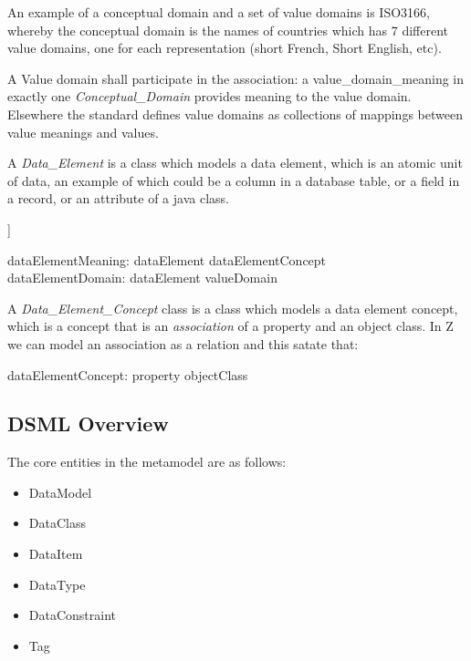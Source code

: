\documentclass{llncs}
\begin{document}
An example of a conceptual domain and a set of value domains is ISO3166, whereby the conceptual domain is the names of countries which has 7 different value domains, one for each representation (short French, Short English, etc).

A Value domain shall participate in the association: a value\_domain\_meaning in exactly one \emph{Conceptual\_Domain} provides meaning to the value domain. Elsewhere the standard defines value domains as collections of mappings between value meanings and values.

A \emph{Data\_Element} is a class which models a data element, which is an atomic unit of data, an example of which could be a column in a database table, or a field in a record, or an attribute of a java class.


\begin{zed}
]
\end{zed}
\begin{zed}
dataElementMeaning: dataElement \pfun dataElementConcept\\
dataElementDomain: dataElement \pfun valueDomain
\end{zed}

A \emph{Data\_Element\_Concept} class is a class which models a data element concept, which is a concept that is an \emph{association} of a property and an object class. In Z we can model an association as a relation and this satate that:

\begin{zed}
dataElementConcept: property \pfun objectClass\\
\end{zed}








\subsection{DSML Overview}

The core entities in the metamodel are as follows:
\begin{itemize}
\item DataModel
\item DataClass
\item DataItem
\item DataType
\item DataConstraint
\item Tag
\end{itemize}
\end{document}
